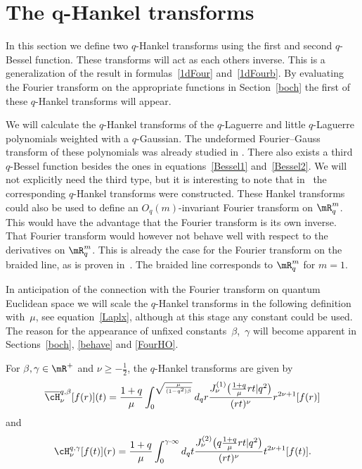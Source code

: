 \section[The $q$-Hankel transforms]{The $\boldsymbol{q}$-Hankel transforms}
\label{Hanksect}

In this section we def\/ine two $q$-Hankel transforms using the f\/irst and second $q$-Bessel function. These transforms will act as each others inverse. This is a generalization of the result in formulas~\eqref{1dFour} and~\eqref{1dFourb}. By evaluating the Fourier transform on the appropriate functions in Section~\ref{boch} the f\/irst of these $q$-Hankel transforms will appear.

We will calculate the $q$-Hankel transforms of the $q$-Laguerre and little $q$-Laguerre polynomials weighted with a $q$-Gaussian. The undeformed Fourier--Gauss transform of these polynomials was already studied in \cite{MR1479780}. There also exists a third $q$-Bessel function besides the ones in equations~\eqref{Bessel1} and~\eqref{Bessel2}. We will not explicitly need the third type, but it is interesting to note that in~\cite{MR1069750, MR2445269} the corresponding $q$-Hankel transforms were constructed. These Hankel transforms could also be used to def\/ine an $O_q(m)$-invariant Fourier transform on $\mR^m_q$. This would have the advantage that the Fourier transform is its own inverse. That Fourier transform would however not behave well with respect to the derivatives on $\mR^m_q$. This is already the case for the Fourier transform on the braided line, as is proven in~\cite{MR1069750}. The braided line corresponds to $\mR^m_q$ for $m=1$.


In anticipation of the connection with the Fourier transform on quantum Euclidean space we will scale the $q$-Hankel transforms in the following def\/inition with~$\mu$, see equation~\eqref{Laplx}, although at this stage any constant could be used. The reason for the appearance of unf\/ixed constants~$\beta$,~$\gamma$ will become apparent in Sections~\ref{boch}, \ref{behave} and \ref{FourHO}.
\begin{definition}
\label{defHankel}
For $\beta,\gamma\in\mR^+$ and $\nu\ge-\frac{1}{2}$, the $q$-Hankel transforms are given by
\begin{gather*}
\overline{\cH}_{\nu}^{q,\beta}[f(r)](t) = \frac{1+q}{\mu}\int_0^{\sqrt{\frac{\mu}{(1-q^2)\beta}}}d_qr\frac{J_\nu^{(1)}\big(\frac{1+q}{\mu}rt|q^2\big)}{(rt)^{\nu}}r^{2\nu+1}[f(r)]
\end{gather*}
and
\begin{gather*}
\cH^{q,\gamma}_{\nu}[f(t)](r) = \frac{1+q}{\mu}\int_0^{\gamma\cdot\infty}d_qt\frac{J_\nu^{(2)}\big(q\frac{1+q}{\mu}rt|q^2\big)}{(rt)^{\nu}}t^{2\nu+1}[f(t)].
\end{gather*}
\end{definition}

